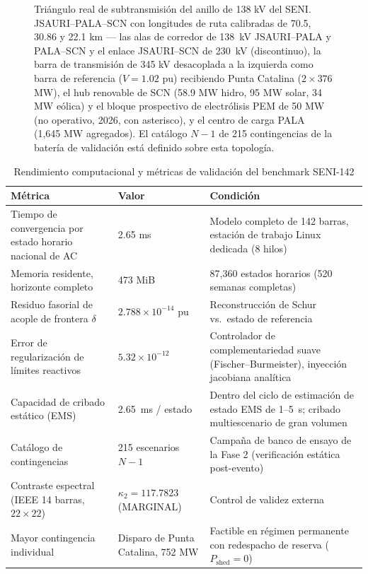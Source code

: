 \begin{figure}[!t]
\centering
\resizebox{0.85\textwidth}{!}{}
\caption{Triángulo real de subtransmisión del anillo de 138 kV del SENI. JSAURI--PALA--SCN con longitudes de ruta calibradas de 70.5, 30.86 y 22.1 km --- las alas de corredor de 138~kV JSAURI--PALA y PALA--SCN y el enlace JSAURI--SCN de 230~kV (discontinuo), la barra de transmisión de 345 kV desacoplada a la izquierda como barra de referencia ($V = 1.02$ pu) recibiendo Punta Catalina ($2 \times 376$ MW), el hub renovable de SCN (58.9 MW hidro, 95 MW solar, 34 MW eólica) y el bloque prospectivo de electrólisis PEM de 50 MW (no operativo, 2026, con asterisco), y el centro de carga PALA (1,645 MW agregados). El catálogo $N-1$ de 215 contingencias de la batería de validación está definido sobre esta topología.}
\label{fig:topologia_seni}
\end{figure}

\begin{table}[!t]
\caption{Rendimiento computacional y métricas de validación del benchmark SENI-142}
\label{tab:telemetry}
\centering
\footnotesize
\begin{tabular}{@{}p{} p{} p{}@{}}
\toprule
\textbf{Métrica} & \textbf{Valor} & \textbf{Condición} \\
\midrule
Tiempo de convergencia por estado horario nacional de AC & 2.65 ms & Modelo completo de 142 barras, estación de trabajo Linux dedicada (8 hilos) \\
Memoria residente, horizonte completo & 473 MiB & 87,360 estados horarios (520 semanas completas) \\
Residuo fasorial de acople de frontera $\delta$ & $2.788 \times 10^{-14}$ pu & Reconstrucción de Schur vs.\ estado de referencia \\
Error de regularización de límites reactivos & $5.32 \times 10^{-12}$ & Controlador de complementariedad suave (Fischer--Burmeister), inyección jacobiana analítica \\
Capacidad de cribado estático (EMS) & 2.65~ms / estado & Dentro del ciclo de estimación de estado EMS de 1--5~s; cribado multiescenario de gran volumen \\
Catálogo de contingencias & 215 escenarios $N-1$ & Campaña de banco de ensayo de la Fase 2 (verificación estática post-evento) \\
Contraste espectral (IEEE 14 barras, $22\times22$) & $\kappa_2 = 117.7823$ (MARGINAL) & Control de validez externa \\
Mayor contingencia individual & Disparo de Punta Catalina, 752 MW & Factible en régimen permanente con redespacho de reserva ($P_{\mathrm{shed}} = 0$) \\
\bottomrule
\end{tabular}
\end{table}
